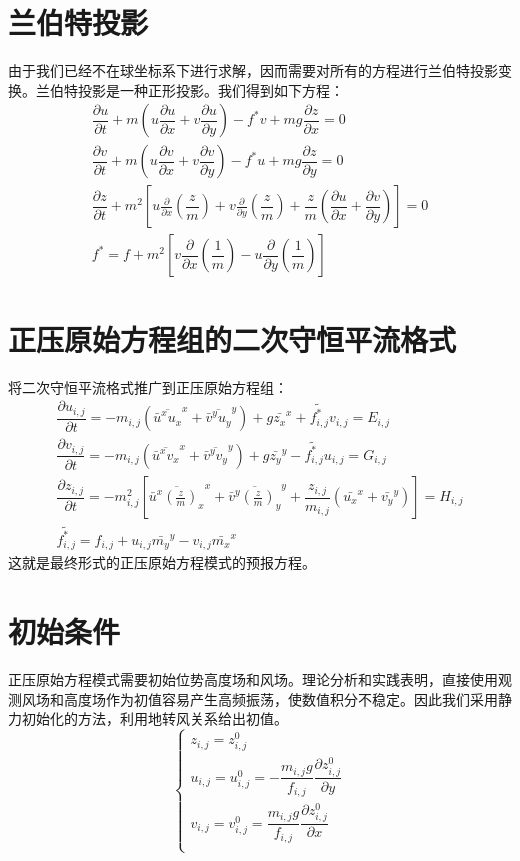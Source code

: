 \documentclass[a4paper,12pt]{article}
\begin{document}
\section{兰伯特投影}
由于我们已经不在球坐标系下进行求解，因而需要对所有的方程进行兰伯特投影变换。兰伯特投影是一种正形投影。我们得到如下方程：
\begin{eqnarray}
\dfrac{\partial{u}}{\partial{t}}+m(u\dfrac{\partial{u}}{\partial{x}}+v\dfrac{\partial{u}}{\partial{y}})-f^{\ast}v+mg\dfrac{\partial{z}}{\partial{x}}=0\\
\dfrac{\partial{v}}{\partial{t}}+m(u\dfrac{\partial{v}}{\partial{x}}+v\dfrac{\partial{v}}{\partial{y}})-f^{\ast}u+mg\dfrac{\partial{z}}{\partial{y}}=0\\
\dfrac{\partial{z}}{\partial{t}}+m^2[u\frac{\partial}{\partial{x}}(\dfrac{z}{m})+v\frac{\partial}{\partial{y}}(\dfrac{z}{m})+\dfrac{z}{m}(\dfrac{\partial{u}}{\partial{x}}+\dfrac{\partial{v}}{\partial{y}})]=0\\
f^{\ast}=f+m^2[v\dfrac{\partial}{\partial{x}}(\dfrac{1}{m})-u\dfrac{\partial}{\partial{y}}(\dfrac{1}{m})]
\end{eqnarray}

\section{正压原始方程组的二次守恒平流格式}
将二次守恒平流格式推广到正压原始方程组：
\begin{eqnarray}
\dfrac{\partial{u_{i,j}}}{\partial{t}}=-m_{i,j}(\overline{\bar{u}^xu_x}^x+\overline{\bar{v}^yu_y}^y)+g\bar{z_x}^x+\widetilde{f_{i,j}^{\ast}}v_{i,j}=E_{i,j}\\
\dfrac{\partial{v_{i,j}}}{\partial{t}}=-m_{i,j}(\overline{\bar{u}^xv_x}^x+\overline{\bar{v}^yv_y}^y)+g\bar{z_y}^y-\widetilde{f_{i,j}^{\ast}}u_{i,j}=G_{i,j}\\
\dfrac{\partial{z_{i,j}}}{\partial{t}}=-m_{i,j}^2[\overline{\bar{u}^x(\frac{z}{m})_x}^x+\overline{\bar{v}^y(\frac{z}{m})_y}^y+\dfrac{z_{i,j}}{m_{i,j}}(\bar{u_x}^x+\bar{v_y}^y)]=H_{i,j}\\
\widetilde{f_{i,j}^{\ast}}=f_{i,j}+u_{i,j}\bar{m_y}^y-v_{i,j}\bar{m_x}^x
\end{eqnarray}
这就是最终形式的正压原始方程模式的预报方程。

\section{初始条件}
正压原始方程模式需要初始位势高度场和风场。理论分析和实践表明，直接使用观测风场和高度场作为初值容易产生高频振荡，使数值积分不稳定。因此我们采用静力初始化的方法，利用地转风关系给出初值。
\begin{equation}
\begin{cases}
z_{i,j}=z_{i,j}^0\\
u_{i,j}=u_{i,j}^0=-\dfrac{m_{i,j}g}{f_{i,j}}\dfrac{\partial{z_{i,j}^0}}{\partial{y}}\\
v_{i,j}=v_{i,j}^0=\dfrac{m_{i,j}g}{f_{i,j}}\dfrac{\partial{z_{i,j}^0}}{\partial{x}}\\
\end{cases}
\end{equation}
\end{document}
